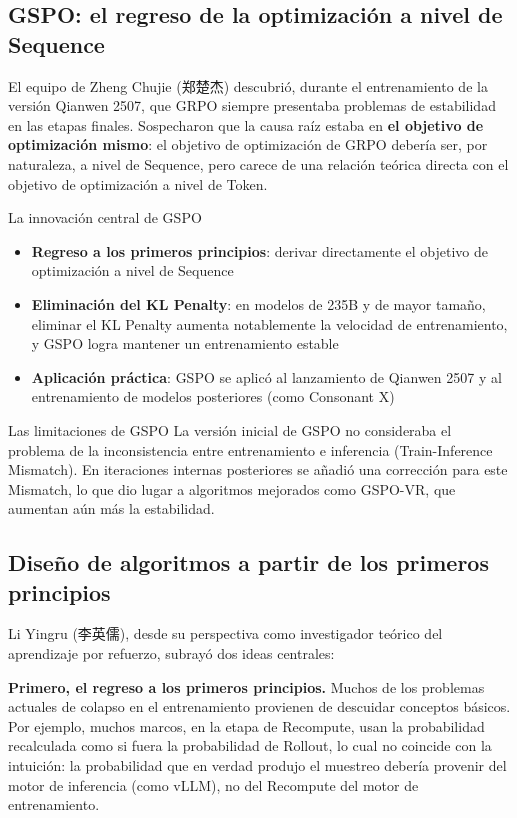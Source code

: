 \documentclass[a4paper]{article}
\begin{document}
\subsection{GSPO: el regreso de la optimización a nivel de Sequence}

El equipo de Zheng Chujie (郑楚杰) descubrió, durante el entrenamiento de la versión Qianwen 2507, que GRPO siempre presentaba problemas de estabilidad en las etapas finales. Sospecharon que la causa raíz estaba en \textbf{el objetivo de optimización mismo}: el objetivo de optimización de GRPO debería ser, por naturaleza, a nivel de Sequence, pero carece de una relación teórica directa con el objetivo de optimización a nivel de Token.

\begin{importantbox}{La innovación central de GSPO}
\begin{itemize}
    \item \textbf{Regreso a los primeros principios}: derivar directamente el objetivo de optimización a nivel de Sequence
    \item \textbf{Eliminación del KL Penalty}: en modelos de 235B y de mayor tamaño, eliminar el KL Penalty aumenta notablemente la velocidad de entrenamiento, y GSPO logra mantener un entrenamiento estable
    \item \textbf{Aplicación práctica}: GSPO se aplicó al lanzamiento de Qianwen 2507 y al entrenamiento de modelos posteriores (como Consonant X)
\end{itemize}
\end{importantbox}

\begin{warningbox}{Las limitaciones de GSPO}
La versión inicial de GSPO no consideraba el problema de la inconsistencia entre entrenamiento e inferencia (Train-Inference Mismatch). En iteraciones internas posteriores se añadió una corrección para este Mismatch, lo que dio lugar a algoritmos mejorados como GSPO-VR, que aumentan aún más la estabilidad.
\end{warningbox}

\subsection{Diseño de algoritmos a partir de los primeros principios}

Li Yingru (李英儒), desde su perspectiva como investigador teórico del aprendizaje por refuerzo, subrayó dos ideas centrales:

\textbf{Primero, el regreso a los primeros principios.} Muchos de los problemas actuales de colapso en el entrenamiento provienen de descuidar conceptos básicos. Por ejemplo, muchos marcos, en la etapa de Recompute, usan la probabilidad recalculada como si fuera la probabilidad de Rollout, lo cual no coincide con la intuición: la probabilidad que en verdad produjo el muestreo debería provenir del motor de inferencia (como vLLM), no del Recompute del motor de entrenamiento.
\end{document}
